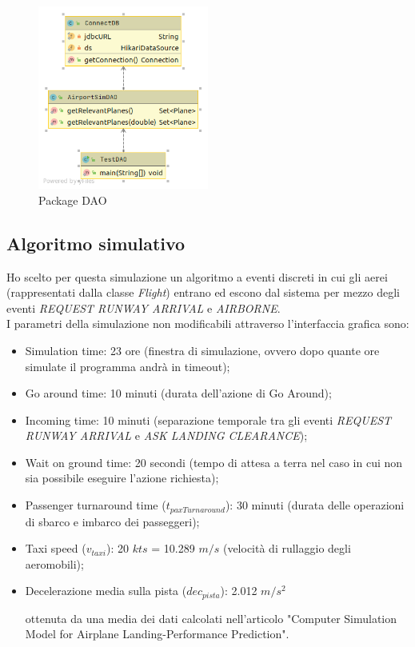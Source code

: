 \documentclass[a4paper, 12pt]{article}
\begin{document}
\begin{figure}[H]
\caption{Package DAO}
 \label{fig:DAO}
\hfill \includegraphics[width=0.5\textwidth]{resources/images/UML/Package DAO.png} \hspace*{\fill}
\end{figure}


	\subsection{Algoritmo simulativo}

Ho scelto per questa simulazione un algoritmo a eventi discreti in cui gli aerei (rappresentati dalla classe \textit{Flight}) entrano ed escono dal sistema per mezzo degli eventi \textit{ REQUEST RUNWAY ARRIVAL} e \textit{AIRBORNE}. \\ I parametri della simulazione non modificabili attraverso l’interfaccia grafica sono:
\begin{itemize}
	\item Simulation time: 23 ore (finestra di simulazione, ovvero dopo quante ore simulate il programma andrà in timeout);

	\item Go around time: 10 minuti (durata dell'azione di Go Around);

	\item Incoming time: 10 minuti (separazione temporale tra gli eventi \textit{REQUEST RUNWAY ARRIVAL} e \textit{ASK LANDING CLEARANCE});

	\item Wait on ground time: 20 secondi (tempo di attesa a terra nel caso in cui non sia possibile eseguire l'azione richiesta);

	\item Passenger turnaround time ($t_{paxTurnaround}$): 30 minuti (durata delle operazioni di sbarco e imbarco dei passeggeri);

	\item Taxi speed ($v_{taxi}$): 20 $kts$ = 10.289 $m/s$  (velocità di rullaggio degli aeromobili);

	\item Decelerazione media sulla pista ($dec_{pista}$): 2.012 $m/{s^2}$

ottenuta da una media dei dati calcolati nell'articolo "Computer Simulation Model for Airplane Landing-Performance Prediction"\cite{Kim1996}.
\end{itemize}
\end{document}
